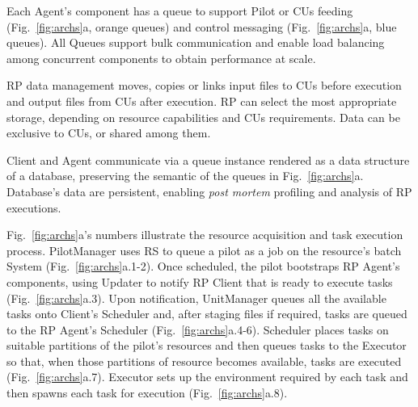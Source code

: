 \documentclass[preprint,12pt, a4paper]{elsarticle}
\begin{document}
Each Agent's component has a queue to support Pilot or CUs feeding
(Fig.~\ref{fig:archs}a, orange queues) and control messaging
(Fig.~\ref{fig:archs}a, blue queues). All Queues support bulk communication
and enable load balancing among concurrent components to obtain performance
at scale.


RP data management moves, copies or links input files to CUs before execution
and output files from CUs after execution. RP can select the most appropriate
storage, depending on resource capabilities and CUs requirements. Data can
be exclusive to CUs, or shared among them.


Client and Agent communicate via a queue instance rendered as a data
structure of a database, preserving the semantic of the queues in
Fig.~\ref{fig:archs}a. Database's data are persistent, enabling \textit{post
mortem} profiling and analysis of RP executions.

Fig.~\ref{fig:archs}a's numbers illustrate the resource acquisition and
task execution process. PilotManager uses RS to queue a pilot as a job on
the resource's batch System (Fig.~\ref{fig:archs}a.1-2). Once scheduled,
the pilot bootstraps RP Agent's components, using Updater to notify RP
Client that is ready to execute tasks (Fig.~\ref{fig:archs}a.3). Upon
notification, UnitManager queues all the available tasks onto Client's
Scheduler and, after staging files if required, tasks are queued to the RP
Agent's Scheduler (Fig.~\ref{fig:archs}a.4-6). Scheduler places tasks on
suitable partitions of the pilot's resources and then queues tasks to the
Executor so that, when those partitions of resource becomes available,
tasks are executed (Fig.~\ref{fig:archs}a.7). Executor sets up the
environment required by each task and then spawns each task for execution
(Fig.~\ref{fig:archs}a.8).
\end{document}
